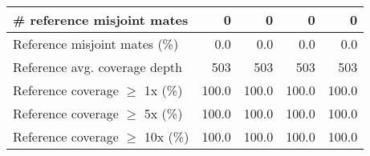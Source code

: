 \documentclass[12pt,a4paper]{article}
\begin{document}
\begin{table}[ht]
\begin{center}
\begin{tabular}{|l*{4}{|r}|}
\# reference misjoint mates & 0 & 0 & 0 & 0 \\ \hline
Reference misjoint mates (\%) & 0.0 & 0.0 & 0.0 & 0.0 \\ \hline
Reference avg. coverage depth & 503 & 503 & 503 & 503 \\ \hline
Reference coverage $\geq$ 1x (\%) & 100.0 & 100.0 & 100.0 & 100.0 \\ \hline
Reference coverage $\geq$ 5x (\%) & 100.0 & 100.0 & 100.0 & 100.0 \\ \hline
Reference coverage $\geq$ 10x (\%) & 100.0 & 100.0 & 100.0 & 100.0 \\ \hline
\end{tabular}
\end{center}
\end{table}
\end{document}
